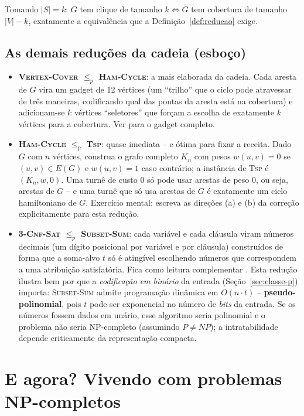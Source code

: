 \documentclass[9pt,a4paper]{extarticle}
\newcommand{\impt}[1]{\textcolor{important}{\textbf{#1}}}
\newcommand{\ntc}[1]{\textcolor{notice}{#1}}
\theoremstyle{definition}
\begin{document}
Tomando \(|S| = k\): \(G\) tem clique de tamanho \(k \iff \bar G\) tem cobertura de tamanho \(|V|-k\), exatamente a equivalência que a Definição~\ref{def:reducao} exige.

\subsection{As demais reduções da cadeia (esboço)}\label{sec:demais}

\begin{itemize}
\item \impt{\textsc{Vertex-Cover} \(\leq_p\) \textsc{Ham-Cycle}}: a mais elaborada da cadeia. Cada aresta de \(G\) vira um gadget de 12 vértices (um \enquote{trilho} que o ciclo pode atravessar de três maneiras, codificando qual das pontas da aresta está na cobertura) e adicionam-se \(k\) vértices \enquote{seletores} que forçam a escolha de exatamente \(k\) vértices para a cobertura. Ver \citet[Seção 34.5.3]{clrs2009} para o gadget completo.
\item \impt{\textsc{Ham-Cycle} \(\leq_p\) \textsc{Tsp}}: quase imediata -- e ótima para fixar a receita. Dado \(G\) com \(n\) vértices, construa o grafo completo \(K_n\) com pesos \(w(u,v)=0\) se \((u,v)\in E(G)\) e \(w(u,v)=1\) caso contrário; a instância de \textsc{Tsp} é \((K_n, w, 0)\). Uma turnê de custo \(0\) só pode usar arestas de peso \(0\), ou seja, arestas de \(G\) -- e uma turnê que só usa arestas de \(G\) é exatamente um ciclo hamiltoniano de \(G\). \ntc{Exercício mental: escreva as direções (a) e (b) da correção explicitamente para esta redução.}
\item \impt{\textsc{3-Cnf-Sat} \(\leq_p\) \textsc{Subset-Sum}}: cada variável e cada cláusula viram números decimais (um dígito posicional por variável e por cláusula) construídos de forma que a soma-alvo \(t\) só é atingível escolhendo números que correspondem a uma atribuição satisfatória. Fica como leitura complementar \citep[Seção 34.5.5]{clrs2009}. Esta redução ilustra bem por que a \emph{codificação em binário} da entrada (Seção~\ref{sec:classe-p}) importa: \textsc{Subset-Sum} admite programação dinâmica em \(O(n \cdot t)\) -- \impt{pseudo-polinomial}, pois \(t\) pode ser exponencial no número de \emph{bits} da entrada. Se os números fossem dados em unário, esse algoritmo seria polinomial e o problema não seria NP-completo (assumindo \(P \neq NP\)); a intratabilidade depende criticamente da representação compacta.
\end{itemize}

\section{E agora? Vivendo com problemas NP-completos}\label{sec:e-agora}
\end{document}
